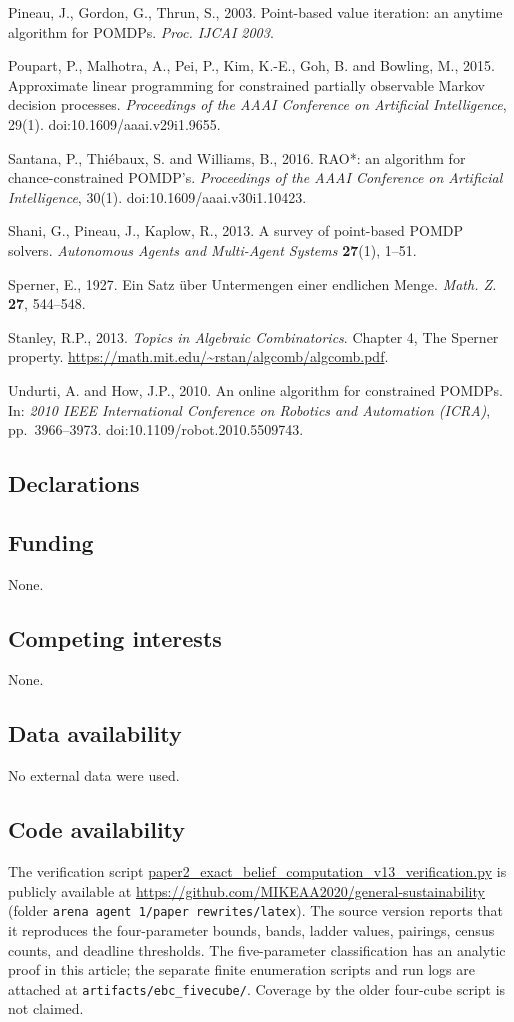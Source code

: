 \documentclass[10pt,twocolumn]{article}
\theoremstyle{plain}
\theoremstyle{definition}
\theoremstyle{remark}
\begin{document}
Pineau, J., Gordon, G., Thrun, S., 2003. Point-based value iteration: an anytime algorithm
for POMDPs. \emph{Proc. IJCAI 2003}.

Poupart, P., Malhotra, A., Pei, P., Kim, K.-E., Goh, B. and Bowling, M., 2015.
Approximate linear programming for constrained partially observable Markov decision
processes. \emph{Proceedings of the AAAI Conference on Artificial Intelligence}, 29(1).
doi:10.1609/aaai.v29i1.9655.

Santana, P., Thi\'ebaux, S. and Williams, B., 2016. RAO*: an algorithm for
chance-constrained POMDP's. \emph{Proceedings of the AAAI Conference on Artificial
Intelligence}, 30(1). doi:10.1609/aaai.v30i1.10423.


Shani, G., Pineau, J., Kaplow, R., 2013. A survey of point-based POMDP solvers.
\emph{Autonomous Agents and Multi-Agent Systems} \textbf{27}(1), 1--51.

Sperner, E., 1927. Ein Satz \"uber Untermengen einer endlichen Menge. \emph{Math. Z.}
\textbf{27}, 544--548.

Stanley, R.P., 2013. \emph{Topics in Algebraic Combinatorics}. Chapter 4, The Sperner
property. \url{https://math.mit.edu/~rstan/algcomb/algcomb.pdf}.

Undurti, A. and How, J.P., 2010. An online algorithm for constrained POMDPs. In:
\emph{2010 IEEE International Conference on Robotics and Automation (ICRA)}, pp.~3966--3973.
doi:10.1109/robot.2010.5509743.


\subsection*{Declarations}

\subsection*{Funding}
None.

\subsection*{Competing interests}
None.

\subsection*{Data availability}
No external data were used.

\subsection*{Code availability}
The verification script
\url{paper2_exact_belief_computation_v13_verification.py} is publicly
available at \url{https://github.com/MIKEAA2020/general-sustainability}
(folder \texttt{arena agent 1/paper rewrites/latex}). The source version reports that it reproduces the four-parameter bounds, bands, ladder values, pairings, census counts, and deadline thresholds. The five-parameter classification has an analytic proof in this article; the separate finite enumeration scripts and run logs are attached at \texttt{artifacts/ebc\_fivecube/}. Coverage by the older four-cube script is not claimed.
\end{document}
